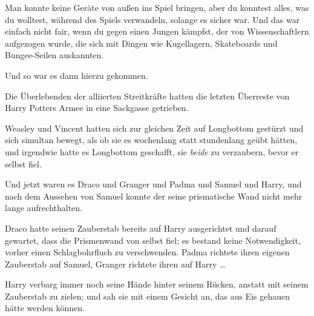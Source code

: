 Man konnte keine Geräte von außen ins Spiel bringen, aber du konntest alles, was du wolltest, während des Spiels verwandeln, solange es sicher war. Und das war einfach nicht fair, wenn du gegen einen Jungen kämpfst, der von Wissenschaftlern aufgezogen wurde, die sich mit Dingen wie Kugellagern, Skateboards und Bungee-Seilen auskannten.

Und so war es dann hierzu gekommen.

Die Überlebenden der alliierten Streitkräfte hatten die letzten Überreste von Harry Potters Armee in eine Sackgasse getrieben.

Weasley und Vincent hatten sich zur gleichen Zeit auf Longbottom gestürzt und sich simultan bewegt, als ob sie es wochenlang statt stundenlang geübt hätten, und irgendwie hatte es Longbottom geschafft, sie \emph{beide} zu verzaubern, bevor er selbst fiel.

Und jetzt waren es Draco und Granger und Padma und Samuel und Harry, und nach dem Aussehen von Samuel konnte der seine prismatische Wand nicht mehr lange aufrechthalten.

Draco hatte seinen Zauberstab bereits auf Harry ausgerichtet und darauf gewartet, dass die Prismenwand von selbst fiel; es bestand keine Notwendigkeit, vorher einen Schlagbohrfluch zu verschwenden. Padma richtete ihren eigenen Zauberstab auf Samuel, Granger richtete ihren auf Harry …

Harry verbarg immer noch seine Hände hinter seinem Rücken, anstatt mit seinem Zauberstab zu zielen; und sah sie mit einem Gesicht an, das aus Eis gehauen hätte werden können.


